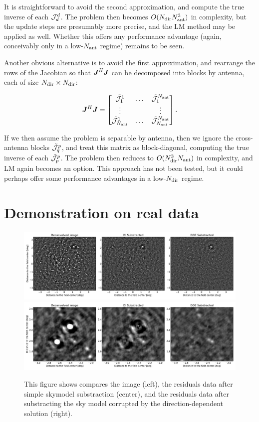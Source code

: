 \documentclass[useAMS,usenatbib]{mn2e}
\newcommand{\mat}[1]{{\bmath{#1}}}
\newcommand{\JJ}{\mat{J}} %
\newcommand{\JHJ}{\JJ^H\JJ} %
\begin{document}
It is straightforward to avoid the second approximation, and compute the true inverse of each $\mathcal{J}^d_d$. The problem then becomes
$O(N_\mathrm{dir}N_\mathrm{ant}^3)$ in complexity, but the update steps are presumably more precise, and the LM method may be applied as well. Whether
this offers any performance advantage (again, conceivably only in a low-$N_\mathrm{ant}$ regime) remains to be seen.

Another obvious alternative is to avoid the first approximation, and rearrange the rows of the Jacobian so that $\JHJ$ 
can be decomposed into blocks by antenna, each of size $N_\mathrm{dir}\times N_\mathrm{dir}$:

\newcommand{\JJX}{\tilde{\JJJ}}
\begin{equation}
\label{eq:JHJ:DD:blocked-ant}
\JHJ = \Matrix{ccc}{\JJX^1_1 & \dots & \JJX^{\Na}_1 \\
\vdots & & \vdots \\
\JJX_{\Na}^1 & \dots & \JJX_{\Na}^{\Na} }.
\end{equation}

If we then assume the problem is separable by antenna, then we ignore the cross-antenna blocks $\JJX^p_q$, and treat this 
matrix as block-diagonal, computing the true inverse of each $\JJX^p_p$. The problem then reduces to $O(N_\mathrm{dir}^3N_\mathrm{ant})$ in complexity, 
and LM again becomes an option. This approach has not been tested, but it could perhaps offer some performance advantages in a low-$N_\mathrm{dir}$ regime.

\section{Demonstration on real data}

\begin{figure}
\begin{center}
\includegraphics[width=\textwidth]{resid}
\includegraphics[width=\textwidth]{residZoom}
\caption{\label{fig:resid} This figure shows compares the image
  (left), the residuals data after simple skymodel substraction
  (center), and the residuals data after substracting the
  sky model corrupted by the direction-dependent solution (right).}
\end{center}
\end{figure}
\end{document}

